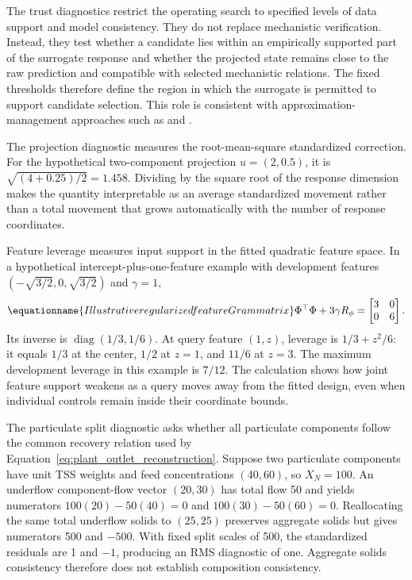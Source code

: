 The trust diagnostics restrict the operating search to specified levels of data support and model consistency. They do not replace mechanistic verification. Instead, they test whether a candidate lies within an empirically supported part of the surrogate response and whether the projected state remains close to the raw prediction and compatible with selected mechanistic relations. The fixed thresholds therefore define the region in which the surrogate is permitted to support candidate selection. This role is consistent with approximation-management approaches such as \citet{Alexandrov1998} and \citet{Hameed2026}.

The projection diagnostic measures the root-mean-square standardized correction. For the hypothetical two-component projection $u=(2,0.5)$, it is $\sqrt{(4+0.25)/2}=1.458$. Dividing by the square root of the response dimension makes the quantity interpretable as an average standardized movement rather than a total movement that grows automatically with the number of response coordinates.

Feature leverage measures input support in the fitted quadratic feature space. In a hypothetical intercept-plus-one-feature example with development features $(-\sqrt{3/2},0,\sqrt{3/2})$ and $\gamma=1$,
\begin{equation}
\equationname{Illustrative regularized feature Gram matrix}
\Phi^\top\Phi+3\gamma R_\phi=
\begin{bmatrix}3&0\\0&6\end{bmatrix}.
\end{equation}
Its inverse is $\operatorname{diag}(1/3,1/6)$. At query feature $(1,z)$, leverage is $1/3+z^2/6$: it equals $1/3$ at the center, $1/2$ at $z=1$, and $11/6$ at $z=3$. The maximum development leverage in this example is $7/12$. The calculation shows how joint feature support weakens as a query moves away from the fitted design, even when individual controls remain inside their coordinate bounds.

The particulate split diagnostic asks whether all particulate components follow the common recovery relation used by Equation~\eqref{eq:plant_outlet_reconstruction}. Suppose two particulate components have unit TSS weights and feed concentrations $(40,60)$, so $X_N=100$. An underflow component-flow vector $(20,30)$ has total flow 50 and yields numerators $100(20)-50(40)=0$ and $100(30)-50(60)=0$. Reallocating the same total underflow solids to $(25,25)$ preserves aggregate solids but gives numerators 500 and $-500$. With fixed split scales of 500, the standardized residuals are 1 and $-1$, producing an RMS diagnostic of one. Aggregate solids consistency therefore does not establish composition consistency.

